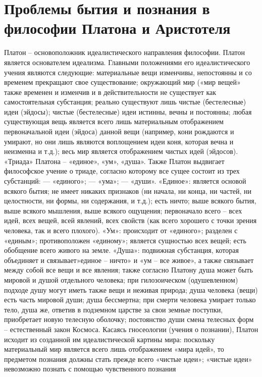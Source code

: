 \documentclass[12pt]{article}
\begin{document}
\newpage
\section{Проблемы бытия и познания в философии Платона и Аристотеля}
Платон – основоположник идеалистического направления философии.
Платон  является  основателем  идеализма.  Главными  положениями  его  идеалистического  учения  являются
следующие:
материальные вещи изменчивы, непостоянны и со временем прекращают свое существование;
окружающий  мир  («мир  вещей»  также  временен  и  изменчив  и  в  действительности  не  существует  как
самостоятельная субстанция;
реально существуют лишь чистые (бестелесные) идеи (эйдосы);
чистые (бестелесные) идеи истинны, вечны и постоянны;
любая существующая вещь является всего лишь материальным отображением первоначальной идеи (эйдоса)
данной вещи (например, кони рождаются и умирают, но они лишь являются воплощением идеи коня, которая
вечна и неизменна и т.д.);
весь мир является отображением чистых идей (эйдосов).
«Триада» Платона – «единое», «ум», «душа».
Также  Платон  выдвигает  философское  учение  о  триаде,  согласно  которому  все  сущее  состоит  из  трех
субстанций:
— «единого»;
— «ума»;
— «души».
«Единое»:
является основой всякого бытия;
не имеет никаких признаков (ни начала, ни конца, ни частей, ни целостности, ни формы, ни содержания, и т.д.);
есть ничто;
выше всякого бытия, выше всякого мышления, выше всякого ощущения;
первоначало всего – всех идей, всех вещей, всей явлений, всех свойств (как всего хорошего с точки зрения
человека, так и всего плохого).
«Ум»:
происходит от «единого»; разделен с «единым»; противоположен «единому»; является сущностью всех вещей;
есть обобщение всего живого на земле.
«Душа»:
подвижная субстанция, которая объединяет и связывает»единое – ничто» и «ум – все живое», а также связывает
между собой все вещи и все явления; также согласно Платону душа может быть мировой и душой отдельного
человека; при гилозоическом (одушевленном) подходе душу могут иметь также вещи и неживая природа;
душа человека (вещи) есть часть мировой души;
душа бессмертна;
при смерти человека умирает только тело, душа же, ответив в подземном царстве за свои земные поступки,
приобретает новую телесную оболочку;
постоянство души смена телесных форм – естественный закон Космоса.
Касаясь гносеологии (учения о познании), Платон исходит из созданной им идеалистической картины мира:
поскольку материальный мир является всего лишь отображением «мира идей», то предметом познания должны
стать прежде всего «чистые идеи»; «чистые идеи» невозможно познать с помощью чувственного познания
\end{document}
